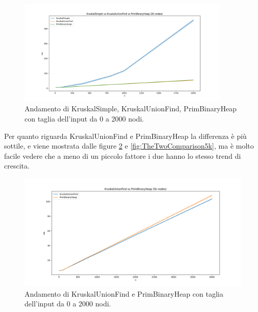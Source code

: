 \begin{figure}[H]
    \centering
    \includegraphics[width=0.9\textwidth]{./images/KruskalSimple_vs_KruskalUnionFind_vs_PrimBinaryHeap_(2k_nodes).png}
    \caption{Andamento di KruskalSimple, KruskalUnionFind, PrimBinaryHeap con taglia dell'input da 0 a 2000 nodi.}
    \label{fig:TheThreeComparison2k}
\end{figure}

\noindent Per quanto riguarda KruskalUnionFind e PrimBinaryHeap la differenza è più sottile, 
e viene mostrata dalle figure \ref{fig:TheTwoComparison2k} e \ref{fig:TheTwoComparison5k}, ma è molto facile
vedere che a meno di un piccolo fattore i due hanno lo stesso trend di crescita.

\begin{figure}[H]
    \centering
    \includegraphics[width=1.0\textwidth]{./images/KruskalUnionFind_vs_PrimBinaryHeap_(5k_nodes).png}
	\caption{Andamento di KruskalUnionFind e PrimBinaryHeap con taglia dell'input da 0 a 2000 nodi.}
    \label{fig:TheTwoComparison2k}
\end{figure}

